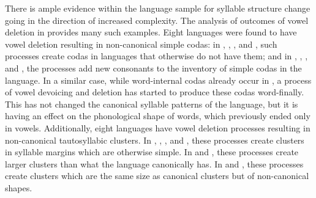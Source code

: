   There is ample evidence within the language sample for syllable structure change going in the direction of increased complexity. The analysis of outcomes of vowel deletion in  provides many such examples. Eight languages were found to have vowel deletion resulting in non-canonical simple codas: in , , , and , such processes create codas in languages that otherwise do not have them; and in , , , and , the processes add new consonants to the inventory of simple codas in the language. In a similar case, while word-internal codas already occur in , a process of vowel devoicing and deletion has started to produce these codas word-finally. This has not changed the canonical syllable patterns of the language, but it is having an effect on the phonological shape of words, which previously ended only in vowels. Additionally, eight languages have vowel deletion processes resulting in non-canonical tautosyllabic clusters. In , , , and , these processes create clusters in syllable margins which are otherwise simple. In  and , these processes create larger clusters than what the language canonically has. In  and , these processes create clusters which are the same size as canonical clusters but of non-canonical shapes.

